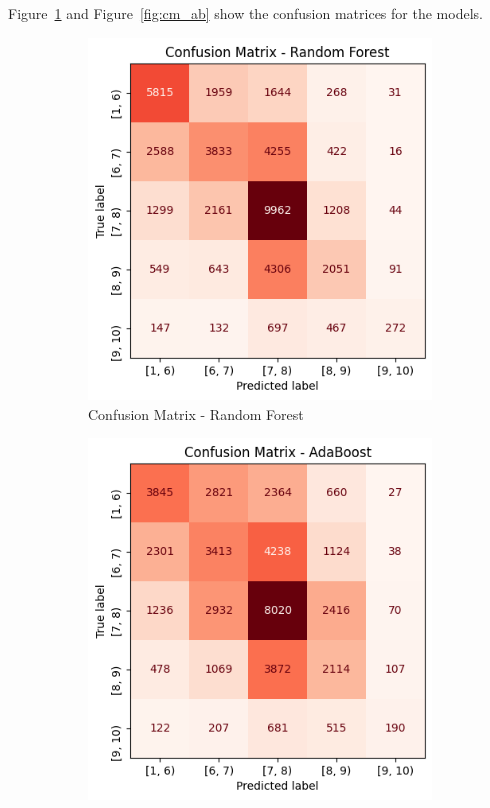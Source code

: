 Figure~\ref{fig:cm_rf} and Figure~\ref{fig:cm_ab} show the confusion matrices
for the models.
\begin{figure}[H]
    \centering
    \begin{subfigure}[b]{0.45\textwidth}
        \centering
        \includegraphics[width=\textwidth]{plotsss/conf_matr_rf_rating}
        \caption{Confusion Matrix - Random Forest}
        \label{fig:cm_rf}
    \end{subfigure}
    \hfill
    \begin{subfigure}[b]{0.45\textwidth}
        \centering
        \includegraphics[width=\textwidth]{plotsss/conf_matr_boost_rating}

\end{subfigure}
\end{figure}
